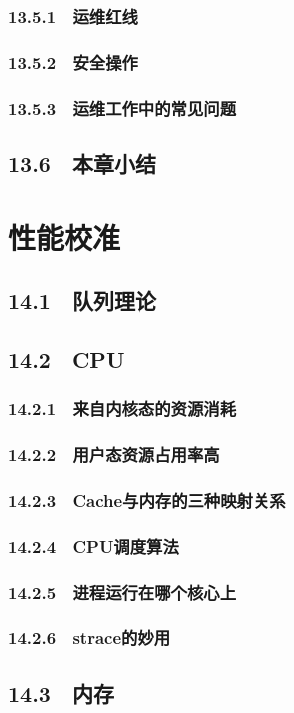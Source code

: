 \documentclass[12pt,UTF8]{ctexbook}
\begin{document}
{\subsection{13.5.1　运维红线}
\subsection{13.5.2　安全操作}
\subsection{13.5.3　运维工作中的常见问题}
\section{13.6　本章小结}
\chapter{性能校准}
\section{14.1　队列理论}
\section{14.2　CPU}
\subsection{14.2.1　来自内核态的资源消耗}
\subsection{14.2.2　用户态资源占用率高}
\subsection{14.2.3　Cache与内存的三种映射关系}
\subsection{14.2.4　CPU调度算法}
\subsection{14.2.5　进程运行在哪个核心上}
\subsection{14.2.6　strace的妙用}
\section{14.3　内存}
}
\end{document}
